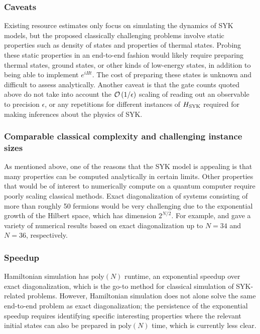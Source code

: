 \begin{refsection}
\subsubsection*{Caveats}
Existing resource estimates only focus on simulating the dynamics of SYK models, but the proposed classically challenging problems involve static properties such as density of states and properties of thermal states. Probing these static properties in an end-to-end fashion would likely require preparing thermal states, ground states, or other kinds of low-energy states, in addition to being able to implement $e^{iHt}$. The cost of preparing these states is unknown and difficult to assess analytically. Another caveat is that the gate counts quoted above do not take into account the $\mathcal{O}\left( 1/\epsilon \right)$ scaling of reading out an observable to precision $\epsilon$, or any repetitions for different instances of $H_{\rm SYK}$ required for making inferences about the physics of SYK. 


\subsubsection*{Comparable classical complexity and challenging instance sizes}
As mentioned above, one of the reasons that the SYK model is appealing is that many properties can be computed analytically in certain limits. 
Other properties that would be of interest to numerically compute on a quantum computer require poorly scaling classical methods. Exact diagonalization of systems consisting of more than roughly 50 fermions would be very challenging due to the exponential growth of the Hilbert space, which has dimension $2^{N/2}$. For example, \cite{cotler2017black} and \cite{garcia-garcia2016spectralSYK} gave a variety of numerical results based on exact diagonalization up to $N=34$ and $N=36$, respectively.


\subsubsection*{Speedup}

Hamiltonian simulation has $\mathrm{poly}(N)$ runtime, an exponential speedup over exact diagonalization, which is the go-to method for classical simulation of SYK-related problems. However, Hamiltonian simulation does not alone solve the same end-to-end problem as exact diagonalization; the persistence of the exponential speedup requires identifying specific interesting properties where the relevant initial states can also be prepared in $\mathrm{poly}(N)$ time, which is currently less clear.





\end{refsection}
